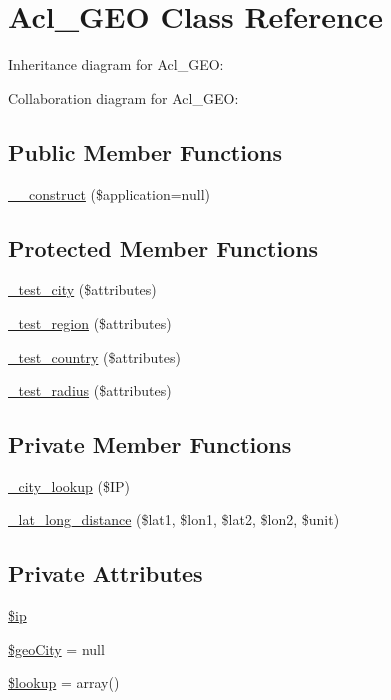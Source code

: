 \hypertarget{classAcl__GEO}{
\section{Acl\_\-GEO Class Reference}
\label{classAcl__GEO}
}


Inheritance diagram for Acl\_\-GEO:


Collaboration diagram for Acl\_\-GEO:
\subsection*{Public Member Functions}
\begin{DoxyCompactItemize}
\item 
\hyperlink{classAcl__GEO_a8093b0bcf6c990bf8b8383fdbbd8510b}{\_\-\_\-construct} (\$application=null)
\end{DoxyCompactItemize}
\subsection*{Protected Member Functions}
\begin{DoxyCompactItemize}
\item 
\hyperlink{classAcl__GEO_ad4726cffe867d61f6b7622f3eb9eeeab}{\_\-test\_\-city} (\$attributes)
\item 
\hyperlink{classAcl__GEO_abae135cd3fe101f3530d7576e5be455b}{\_\-test\_\-region} (\$attributes)
\item 
\hyperlink{classAcl__GEO_ac17a11bd08662571117bc95ffeeb2bee}{\_\-test\_\-country} (\$attributes)
\item 
\hyperlink{classAcl__GEO_a96c0c853be1eea3ab4ed8f6a5d402e3d}{\_\-test\_\-radius} (\$attributes)
\end{DoxyCompactItemize}
\subsection*{Private Member Functions}
\begin{DoxyCompactItemize}
\item 
\hyperlink{classAcl__GEO_ac911ef6f4570f705a3e2d68428bc7494}{\_\-city\_\-lookup} (\$IP)
\item 
\hyperlink{classAcl__GEO_a99ea91caa93777d6de8ae87dc9943e34}{\_\-lat\_\-long\_\-distance} (\$lat1, \$lon1, \$lat2, \$lon2, \$unit)
\end{DoxyCompactItemize}
\subsection*{Private Attributes}
\begin{DoxyCompactItemize}
\item 
\hyperlink{classAcl__GEO_a9a08c84edd46f257c94cdf8d443cc77d}{\$ip}
\item 
\hyperlink{classAcl__GEO_ad68212faa7abb0256e6be7d5234cd337}{\$geoCity} = null
\item 
\hyperlink{classAcl__GEO_abfbf677bba4b657eb5425cdc21cdfbbc}{\$lookup} = array()
\end{DoxyCompactItemize}


